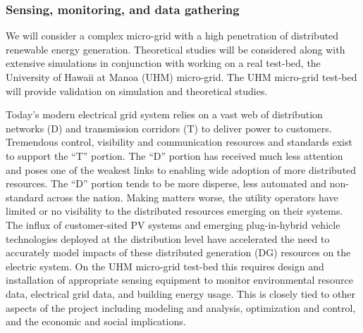 
\subsubsection{Sensing, monitoring, and data gathering}

We will consider a complex micro-grid with a high penetration of
distributed renewable energy generation.  Theoretical studies will be
considered along with extensive simulations in conjunction with working on
a real test-bed, the University of Hawaii at Manoa (UHM) micro-grid.  The
UHM micro-grid test-bed will provide validation on simulation and
theoretical studies.

Today's modern electrical grid system relies on a vast web of distribution
networks (D) and transmission corridors (T) to deliver power to customers.
Tremendous control, visibility and communication resources and standards
exist to support the ``T'' portion.  The ``D'' portion has received much
less attention and poses one of the weakest links to enabling wide adoption
of more distributed resources.  The ``D'' portion tends to be more disperse,
less automated and non-standard across the nation.  Making matters worse,
the utility operators have limited or no visibility to the distributed
resources emerging on their systems.  The influx of customer-sited PV
systems and emerging plug-in-hybrid vehicle technologies deployed at the
distribution level have accelerated the need to accurately model impacts of
these distributed generation (DG) resources on the electric system.  On the
UHM micro-grid test-bed this requires design and installation of
appropriate sensing equipment to monitor environmental resource data,
electrical grid data, and building energy usage.  This is closely tied to
other aspects of the project including modeling and analysis, optimization
and control, and the economic and social implications.
 
